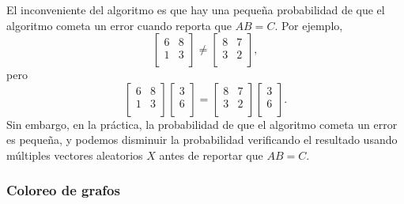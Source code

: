 El inconveniente del algoritmo es
que hay una pequeña probabilidad de que el algoritmo
cometa un error cuando reporta que $AB=C$.
Por ejemplo,
\[
 \begin{bmatrix}
  6 & 8 \\
  1 & 3 \\
 \end{bmatrix}
\neq
 \begin{bmatrix}
  8 & 7 \\
  3 & 2 \\
 \end{bmatrix},
\]
pero
\[
 \begin{bmatrix}
  6 & 8 \\
  1 & 3 \\
 \end{bmatrix}
 \begin{bmatrix}
  3 \\
  6 \\
 \end{bmatrix}
=
 \begin{bmatrix}
  8 & 7 \\
  3 & 2 \\
 \end{bmatrix}
 \begin{bmatrix}
  3 \\
  6 \\
 \end{bmatrix}.
\]
Sin embargo, en la práctica, la probabilidad de que el
algoritmo cometa un error es pequeña,
y podemos disminuir la probabilidad
verificando el resultado usando múltiples vectores aleatorios $X$
antes de reportar que $AB=C$.

\subsubsection{Coloreo de grafos}


